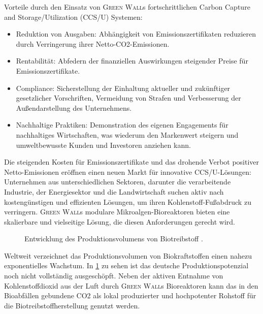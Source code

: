 Vorteile durch den Einsatz von \textsc{Green Wall}s fortschrittlichen Carbon Capture and Storage/Utilization (CCS/U) Systemen:

\begin{itemize}
    \item Reduktion von Ausgaben: Abhängigkeit von Emissionszertifikaten reduzieren durch Verringerung ihrer Netto-CO2-Emissionen.
    \item Rentabilität: Abfedern der finanziellen Auswirkungen steigender Preise für Emissionszertifikate.
    \item Compliance: Sicherstellung der Einhaltung aktueller und zukünftiger gesetzlicher Vorschriften, Vermeidung von Strafen und Verbesserung der Außendarstellung des Unternehmens.
    \item Nachhaltige Praktiken: Demonstration des eigenen Engagements für nachhaltiges Wirtschaften, was wiederum den Markenwert steigern und umweltbewusste Kunden und Investoren anziehen kann.
\end{itemize}

Die steigenden Kosten für Emissionszertifikate und das drohende Verbot positiver Netto-Emissionen eröffnen einen neuen Markt für innovative CCS/U-Lösungen: Unternehmen aus unterschiedlichen Sektoren, darunter die verarbeitende Industrie, der Energiesektor und die Landwirtschaft suchen aktiv nach kostengünstigen und effizienten Lösungen, um ihren Kohlenstoff-Fußabdruck zu verringern.
\textsc{Green Wall}s modulare Mikroalgen-Bioreaktoren bieten eine skalierbare und vielseitige Lösung, die diesen Anforderungen gerecht wird.\par\medskip

\begin{figure}[h]
    \centering
    
    \caption[Entwicklung des Produktionsvolumens von Biotreibstoff]{Entwicklung des Produktionsvolumens von Biotreibstoff \cite{Statista2024.Biof.DE,Statista2024.Biof.EU,Statista2024.Biof.WW}.}\label{fig:biofuel production}
\end{figure}

Weltweit verzeichnet das Produktionsvolumen von Biokraftstoffen einen nahezu exponentielles Wachstum.
In \cref{fig:biofuel production} zu sehen ist das deutsche Produktionspotenzial noch nicht vollständig ausgeschöpft.
Neben der aktiven Entnahme von Kohlenstoffdioxid aus der Luft durch \textsc{Green Wall}s Bioreaktoren kann das in den Bioabfällen gebundene CO2 als lokal produzierter und hochpotenter Rohstoff für die Biotreibstoffherstellung genutzt werden.

